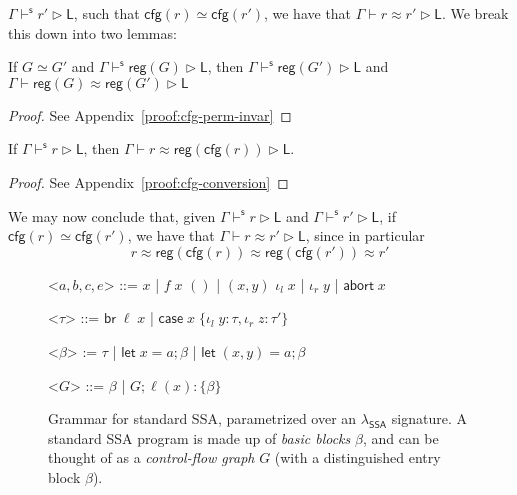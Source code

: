 \documentclass[acmsmall,screen,review]{acmart}
\newcommand{\ms}[1]{\ensuremath{\mathsf{#1}}}
\newcommand{\lto}{:}
\newcommand{\linl}[1]{\iota_l\;{#1}}
\newcommand{\linr}[1]{\iota_r\;{#1}}
\newcommand{\labort}[1]{\ms{abort}\;{#1}}
\newcommand{\letstmt}[3]{\ensuremath{\ms{let}\;#1 = #2; #3}}
\newcommand{\brb}[2]{\ms{br}\;#1\;#2}
\newcommand{\casestmt}[5]{\ms{case}\;#1\;\{\linl{#2} \lto #3, \linr{#4} \lto #5\}}
\newcommand{\wbranch}[3]{#1(#2) \lto \{#3\}}
\newcommand{\shaslb}[3]{#1 \vdash^{\ms{s}} #2 \rhd #3}
\newcommand{\teqv}{\approx}
\newcommand{\lbeq}[4]{#1 \vdash #2 \teqv #3 \rhd {#4}}
\newcommand{\tocfg}[1]{\ms{cfg}(#1)}
\newcommand{\toreg}[1]{\ms{reg}(#1)}
\newcommand{\isotopessa}{\(\lambda_{\ms{SSA}}\)}
\begin{document}
$\shaslb{\Gamma}{r'}{\ms{L}}$, such that $\tocfg{r} \simeq \tocfg{r'}$, we have that
$\lbeq{\Gamma}{r}{r'}{\ms{L}}$. We break this down into two lemmas:
\begin{lemma}[name=Permutation Invariance, restate=cfgperminvar]
  If $G \simeq G'$ and $\shaslb{\Gamma}{\toreg{G}}{\ms{L}}$, then 
    $\shaslb{\Gamma}{\toreg{G'}}{\ms{L}}$ and $\lbeq{\Gamma}{\toreg{G}}{\toreg{G'}}{\ms{L}}$
\end{lemma}
\begin{proof}
  See Appendix~\ref{proof:cfg-perm-invar}
\end{proof}
\begin{lemma}[name=CFG Conversion, restate=cfgconversion]
  If $\shaslb{\Gamma}{r}{\ms{L}}$, then $\lbeq{\Gamma}{r}{\toreg{\tocfg{r}}}{\ms{L}}$.
\end{lemma}
\begin{proof}
  See Appendix~\ref{proof:cfg-conversion}
\end{proof}

We may now conclude that, given $\shaslb{\Gamma}{r}{\ms{L}}$ and $\shaslb{\Gamma}{r'}{\ms{L}}$, if
$\tocfg{r} \simeq \tocfg{r'}$, we have that $\lbeq{\Gamma}{r}{r'}{\ms{L}}$, since in particular
\begin{equation}
  r \teqv \toreg{\tocfg{r}} \teqv \toreg{\tocfg{r'}} \teqv r'
\end{equation}

\begin{figure}[H]
  \begin{center}
    \begin{grammar}
      <\(a, b, c, e\)> ::= \(x\) 
      \;|\;  \(f\;x\)
      \alt  \(()\)
      \;|\; \((x, y)\)
      \alt  \(\linl{x}\) 
      \;|\; \(\linr{y}\)
      \;|\; \(\labort{x}\)
      
      <\(\tau\)> ::= \(\brb{\ell}{x}\) 
      \;|\; \(\casestmt{x}{y}{\tau}{z}{\tau'}\)

      <\(\beta\)> := \(\tau\)
      \;|\; \(\letstmt{x}{a}{\beta}\)
      \;|\; \(\letstmt{(x, y)}{a}{\beta}\)

      <\(G\)> ::= \(\beta\) \;|\; \(G; \wbranch{\ell}{x}{\beta}\)
    \end{grammar}
  \end{center}
  \caption{ Grammar for standard SSA, parametrized over an \isotopessa{} signature. A standard SSA
    program is made up of \emph{basic blocks} \(\beta\), and can be thought of as a
    \emph{control-flow graph} \(G\) (with a distinguished entry block $\beta$). } \Description{}
  \label{fig:ssa-standard}
\end{figure}
\end{document}
